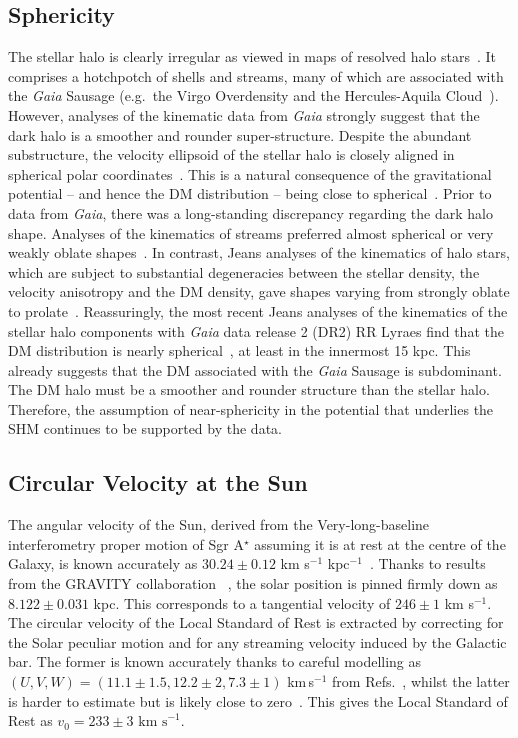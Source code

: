 \documentclass[prd,10pt,twocolumn,showpacs,nofootinbib, aps,superscriptaddress,preprintnumbers]{revtex4-1}
\newcommand{\kms}{\textrm{ km s}^{-1}}
\begin{document}
\subsection{Sphericity}\label{sec:shape}
The stellar halo is clearly irregular as viewed in maps of resolved
halo stars~\cite{Belokurov:2006}. It comprises a hotchpotch of shells
and streams, many of which are associated with the \emph{Gaia} Sausage
(e.g.\ the Virgo Overdensity and the Hercules-Aquila Cloud~\cite{Si18}). 
However, analyses of the kinematic data from
\emph{Gaia} strongly suggest that the dark halo is a smoother and
rounder super-structure. Despite the abundant substructure, the
velocity ellipsoid of the stellar halo is closely aligned in spherical
polar coordinates~\citep{Ev16,We18}. This is a natural consequence of
the gravitational potential -- and hence the DM distribution -- being
close to spherical~\citep{Sm09,An16}.  Prior to data from \emph{Gaia},
there was a long-standing discrepancy regarding the dark halo
shape. Analyses of the kinematics of streams preferred almost
spherical or very weakly oblate shapes~\citep{Ko10,Bo15}. In contrast,
Jeans analyses of the kinematics of halo stars, which are subject to
substantial degeneracies between the stellar density, the velocity
anisotropy and the DM density, gave shapes varying from strongly
oblate to prolate~\citep{lo14,Bo16}. Reassuringly, the most recent
Jeans analyses of the kinematics of the stellar halo components with
\emph{Gaia} data release 2 (DR2) RR Lyraes find that the DM
distribution is nearly spherical~\citep{We18}, at least in the
innermost 15 kpc. This already suggests that the DM associated
with the \emph{Gaia} Sausage is subdominant. The DM halo must be a
smoother and rounder structure than the stellar halo. Therefore, the
assumption of near-sphericity in the potential that underlies the SHM
continues to be supported by the data.

\subsection{Circular Velocity at the Sun}\label{sec:v0}

The angular velocity of the Sun, derived from the Very-long-baseline
interferometry proper motion of Sgr A$^\star$ assuming it is at rest
at the centre of the Galaxy, is known accurately as $30.24 \pm 0.12$
km s$^{-1}$ kpc$^{-1}$~\cite{Re04,Bl16}. Thanks to results from
the GRAVITY collaboration ~\citep{Ab18}, the solar position is pinned
firmly down as $8.122\pm 0.031$ kpc.  This corresponds to a tangential
velocity of $246 \pm 1$ km s$^{-1}$. The circular velocity of the
Local Standard of Rest is extracted by correcting for the Solar
peculiar motion and for any streaming velocity induced by the Galactic
bar. The former is known accurately thanks to careful modelling as
$(U,V,W) = (11.1\pm1.5, 12.2\pm2, 7.3\pm1)$ km\,s$^{-1}$ from
Refs.~\cite{Schonrich:2010,McMillan:2017}, whilst the latter is harder
to estimate but is likely close to zero~\citep{Bl16}. This gives the
Local Standard of Rest as $v_0 = 233 \pm 3 \kms$.
\end{document}

